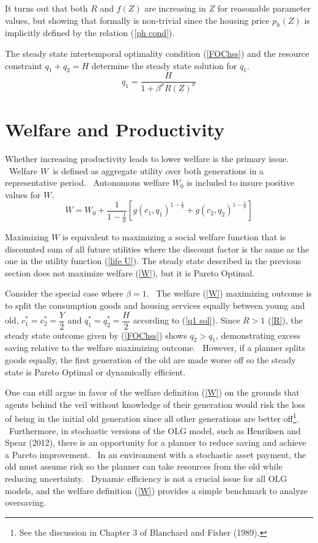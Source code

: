 \documentclass{article}
\begin{document}
\begin{doublespace}
It turns out that both $R$ and $f\left( Z\right) $ are increasing in $Z$ for
reasonable parameter values, but showing that formally is non-trivial since
the housing price $p_{h}\left( Z\right) $ is implicitly defined by the
relation (\ref{ph cond}).

The steady state intertemporal optimality condition (\ref{FOChss}) and the
resource constraint $q_{1}+q_{2}=H$ determine the steady state solution for $%
q_{1}$. 
\begin{equation}
q_{1}=\frac{H}{1+\beta ^{\sigma }R\left( Z\right) ^{\sigma }}  \label{q1 sol}
\end{equation}

\section{Welfare and Productivity}

Whether increasing productivity leads to lower welfare is the primary issue.
\ Welfare $W$\ is defined as aggregate utility over both generations in a
representative period. \ Autonomous welfare $W_{0}$ is included to insure
positive values for $W.$ 
\begin{equation}
W=W_{0}+\frac{1}{1-\frac{1}{\sigma }}\left[ g\left( c_{1},q_{1}\right) ^{1-%
\frac{1}{\sigma }}+g\left( c_{2},q_{2}\right) ^{1-\frac{1}{\sigma }}\right]
\label{W}
\end{equation}

Maximizing $W$ is equivalent to maximizing a social welfare function that is
discounted sum of all future utilities where the discount factor is the same
as the one in the utility function (\ref{life U}). The steady state
described in the previous section does not maximize welfare (\ref{W}), but
it is Pareto Optimal.

Consider the special case where $\beta =1$. \ The welfare (\ref{W})
maximizing outcome is to split the consumption goods and housing services
equally between young and old, $c_{1}^{\ast }=c_{2}^{\ast }=\dfrac{Y}{2}$
and $q_{1}^{\ast }=q_{2}^{\ast }=\dfrac{H}{2}$ according to (\ref{q1 sol})$.$
Since $R>1$ (\ref{R}), the steady state outcome given by (\ref{FOChss})
shows $q_{2}>q_{1}$, demonstrating excess saving relative to the welfare
maximizing outcome. \ However, if a planner splits goods equally, the first
generation of the old are made worse off so the steady state is Pareto
Optimal or dynamically efficient.

One can still argue in favor of the welfare definition (\ref{W}) on the
grounds that agents behind the veil without knowledge of their generation
would risk the loss of being in the initial old generation since all other
generations are better off\footnote{%
See the discussion in Chapter 3 of Blanchard and Fisher (1989).}. \
Furthermore, in stochastic versions of the OLG model, such as Henriksen and
Spear (2012), there is an opportunity for a planner to reduce saving and
achieve a Pareto improvement. \ In an environment with a stochastic asset
payment, the old must assume risk so the planner can take resources from the
old while reducing uncertainty. \ Dynamic efficiency is not a crucial issue
for all OLG models, and the welfare definition (\ref{W}) provides a simple
benchmark to analyze oversaving.


\end{doublespace}
\end{document}
